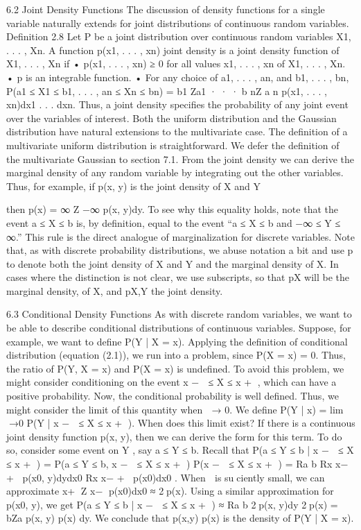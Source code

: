 6.2 Joint Density Functions
The discussion of density functions for a single variable naturally extends for joint distributions of continuous random variables. Definition 2.8 Let P be a joint distribution over continuous random variables X1, . . . , Xn. A function p(x1, . . . , xn) joint density is a joint density function of X1, . . . , Xn if • p(x1, . . . , xn) ≥ 0 for all values x1, . . . , xn of X1, . . . , Xn. • p is an integrable function. • For any choice of a1, . . . , an, and b1, . . . , bn, P(a1 ≤ X1 ≤ b1, . . . , an ≤ Xn ≤ bn) = b1 Za1 · · · b nZ a n p(x1, . . . , xn)dx1 . . . dxn. Thus, a joint density specifies the probability of any joint event over the variables of interest. Both the uniform distribution and the Gaussian distribution have natural extensions to the multivariate case. The definition of a multivariate uniform distribution is straightforward. We defer the definition of the multivariate Gaussian to section 7.1. From the joint density we can derive the marginal density of any random variable by integrating out the other variables. Thus, for example, if p(x, y) is the joint density of X and Y

then p(x) = ∞ Z −∞ p(x, y)dy. To see why this equality holds, note that the event a ≤ X ≤ b is, by definition, equal to the event “a ≤ X ≤ b and −∞ ≤ Y ≤ ∞.” This rule is the direct analogue of marginalization for discrete variables. Note that, as with discrete probability distributions, we abuse notation a bit and use p to denote both the joint density of X and Y and the marginal density of X. In cases where the distinction is not clear, we use subscripts, so that pX will be the marginal density, of X, and pX,Y the joint density.

6.3 Conditional Density Functions
As with discrete random variables, we want to be able to describe conditional distributions of continuous variables. Suppose, for example, we want to define P(Y | X = x). Applying the definition of conditional distribution (equation (2.1)), we run into a problem, since P(X = x) = 0. Thus, the ratio of P(Y, X = x) and P(X = x) is undefined. To avoid this problem, we might consider conditioning on the event x −  ≤ X ≤ x + , which can have a positive probability. Now, the conditional probability is well defined. Thus, we might consider the limit of this quantity when  → 0. We define P(Y | x) = lim →0 P(Y | x −  ≤ X ≤ x + ). When does this limit exist? If there is a continuous joint density function p(x, y), then we can derive the form for this term. To do so, consider some event on Y , say a ≤ Y ≤ b. Recall that P(a ≤ Y ≤ b | x −  ≤ X ≤ x + ) = P(a ≤ Y ≤ b, x −  ≤ X ≤ x + ) P(x −  ≤ X ≤ x + ) = Ra b Rx x− + p(x0, y)dydx0 Rx x− + p(x0)dx0 . When  is suciently small, we can approximate x+ Z x− p(x0)dx0 ≈ 2p(x). Using a similar approximation for p(x0, y), we get P(a ≤ Y ≤ b | x −  ≤ X ≤ x + ) ≈ Ra b 2p(x, y)dy 2p(x) = bZa p(x, y) p(x) dy. We conclude that p(x,y) p(x) is the density of P(Y | X = x).

